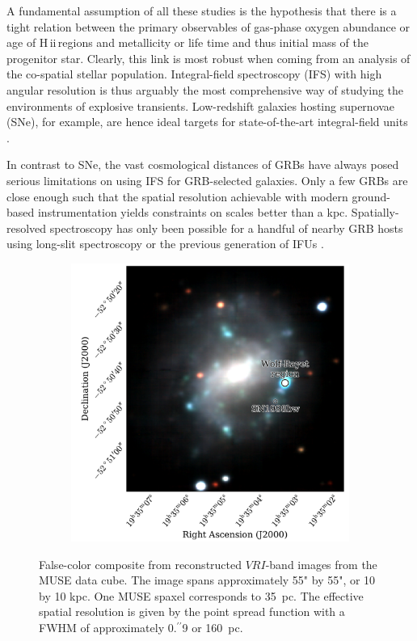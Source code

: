 \documentclass[traditabstract]{aa}
\newcommand{\farc}{\hbox{$.\!\!^{\prime\prime}$}}
\newcommand{\hii}{\mbox{H\,{\sc ii}}}
\begin{document}
A fundamental assumption of all these studies is the hypothesis that there is a tight relation between the primary observables of gas-phase oxygen abundance or age of \hii\,regions and metallicity or life time and thus initial mass of the progenitor star. Clearly, this link is most robust when coming from an analysis of the co-spatial stellar population. Integral-field spectroscopy (IFS) with high angular resolution is thus arguably the most comprehensive way of studying the environments of explosive transients. Low-redshift galaxies hosting supernovae (SNe), for example, are hence ideal targets for state-of-the-art integral-field units \citep[IFUs, e.g.][]{2013AJ....146...30K, 2014A&A...572A..38G}.

In contrast to SNe, the vast cosmological distances of GRBs \citep[e.g.][]{2009ApJS..185..526F, 2009Natur.461.1254T, 2012ApJ...758...46K} have always posed serious limitations on using IFS for GRB-selected galaxies. Only a few GRBs are close enough such that the spatial resolution achievable with modern ground-based instrumentation yields constraints on scales better than a kpc. Spatially-resolved spectroscopy has only been possible for a handful of nearby GRB hosts using long-slit spectroscopy \citep[e.g.][]{2008ApJ...676.1151T, 2011ApJ...739...23L, 2015A&A...579A.126S} or the previous generation of IFUs \citep{2008A&A...490...45C, 2014MNRAS.441.2034T}. 

\begin{figure}
\begin{subfigure}{.48\textwidth}
  \includegraphics[width=0.999\linewidth]{Figs/MUSE_SN1998bw_RGB.pdf}
\end{subfigure}
\caption{False-color composite from reconstructed $VRI$-band images from the MUSE data cube. The image spans approximately 55" by 55", or 10 by 10 kpc. One MUSE spaxel corresponds to 35~pc. The effective spatial resolution is given by the point spread function with a FWHM of approximately 0\farc{9} or 160~pc.}
\label{fig:Host}
\end{figure}
\end{document}
